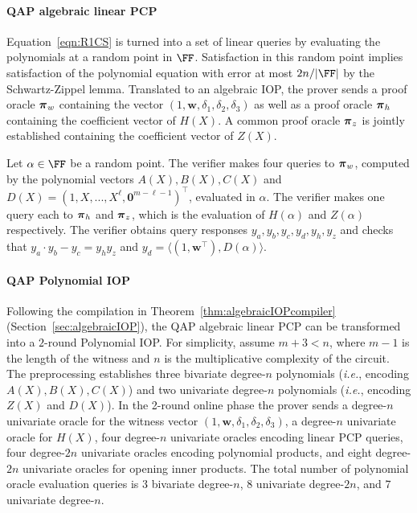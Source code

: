 \paragraph{QAP algebraic linear PCP} Equation~\ref{eqn:R1CS} is turned into a set of linear queries by evaluating the polynomials at a random point in $\FF$. Satisfaction in this random point implies satisfaction of the polynomial equation with error at most $2n / |\FF|$ by the Schwartz-Zippel lemma. Translated to an algebraic IOP, the prover sends a proof oracle $\boldsymbol{\pi}_w$ containing the vector $(1, \mathbf{w}, \delta_1, \delta_2, \delta_3)$ as well as a proof oracle $\boldsymbol{\pi}_h$ containing the coefficient vector of $H(X)$. A common proof oracle $\boldsymbol{\pi}_z$ is jointly established containing the coefficient vector of $Z(X)$. 

Let $\alpha \in \FF$ be a random point. The verifier makes four queries to $\boldsymbol{\pi}_w$, computed by the polynomial vectors $A(X), B(X), C(X)$ and $D(X) = (1, X,...,X^\ell, \mathbf{0}^{m- \ell -1})^\top$, evaluated in $\alpha$. The verifier makes one query each to $\boldsymbol{\pi}_h$ and $\boldsymbol{\pi}_z$, which is the evaluation of $H(\alpha)$ and $Z(\alpha)$ respectively. The verifier obtains query responses $y_a, y_b, y_c, y_d, y_h, y_z$ and checks that $y_a \cdot y_b - y_c = y_h y_z$ and $y_d = \langle (1, \mathbf{w}^\top), D(\alpha) \rangle$. 

\paragraph{QAP Polynomial IOP} 

Following the compilation in Theorem~\ref{thm:algebraicIOPcompiler} (Section~\ref{sec:algebraicIOP}), the QAP algebraic linear PCP can be transformed into a $2$-round Polynomial IOP. For simplicity, assume $m+3 < n$, where $m-1$ is the length of the witness and $n$ is the multiplicative complexity of the circuit. The preprocessing establishes three bivariate degree-$n$ polynomials (\emph{i.e.}, encoding $A(X), B(X), C(X)$) and two univariate degree-$n$ polynomials (\emph{i.e.}, encoding $Z(X)$ and $D(X)$). In the 2-round online phase the prover sends a degree-$n$ univariate oracle for the witness vector $(1, \mathbf{w}, \delta_1, \delta_2, \delta_3)$, a degree-$n$ univariate oracle for $H(X)$, four degree-$n$ univariate oracles encoding linear PCP queries, four degree-$2n$ univariate oracles encoding polynomial products, and eight degree-$2n$ univariate oracles for opening inner products. The total number of polynomial oracle evaluation queries is $3$ bivariate degree-$n$, $8$ univariate degree-$2n$, and $7$ univariate degree-$n$. 

